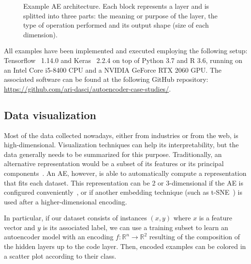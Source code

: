 \begin{figure}[ht]
    \centering\small
    \caption{Example AE architecture. Each block represents a layer and is splitted into three parts: the meaning or purpose of the layer, the type of operation performed and its output shape (size of each dimension).}
    \label{p5fig:exampleae}
\end{figure}

All examples have been implemented and executed employing the following setup: Tensorflow~\cite{tensorflow} 1.14.0 and Keras~\cite{keras} 2.2.4 on top of Python 3.7 and R 3.6, running on an Intel Core i5-8400 CPU and a NVIDIA GeForce RTX 2060 GPU. The associated software can be found at the following GitHub repository: \url{https://github.com/ari-dasci/autoencoder-case-studies/}.


\subsection{Data visualization}

Most of the data collected nowadays, either from industries or from the web, is high-dimensional. Visualization techniques can help its interpretability, but the data generally needs to be summarized for this purpose. Traditionally, an alternative representation would be a subset of its features or its principal components~\cite{jolliffe-pca}. An AE, however, is able to automatically compute a representation that fits each dataset. This representation can be 2 or 3-dimensional if the AE is configured conveniently~\cite{yu2013embedding}, or if another embedding technique (such as t-SNE~\cite{tsne}) is used after a higher-dimensional encoding.

In particular, if our dataset consists of instances $(x, y)$ where $x$ is a feature vector and $y$ is its associated label, we can use a training subset to learn an autoencoder model with an encoding $f: \mathbb R^n\rightarrow \mathbb R^2$ resulting of the composition of the hidden layers up to the code layer. Then, encoded examples can be colored in a scatter plot according to their class.

